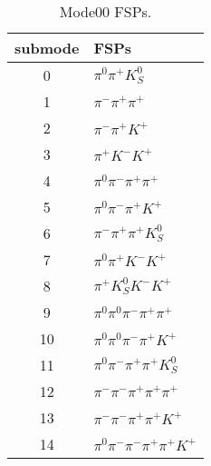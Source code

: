 \begin{table}[h!]
\begin{center}
\begin{tabular}{cl}
\hline
submode& FSPs\\
\hline
0 & $\pi^0 \pi^+ K_S^0 $ \\
1 & $\pi^- \pi^+ \pi^+ $ \\
2 & $\pi^- \pi^+ K^+ $ \\
3 & $\pi^+ K^- K^+ $ \\
4 & $\pi^0 \pi^- \pi^+ \pi^+ $ \\
5 & $\pi^0 \pi^- \pi^+ K^+ $ \\
6 & $\pi^- \pi^+ \pi^+ K_S^0 $ \\
7 & $\pi^0 \pi^+ K^- K^+ $ \\
8 & $\pi^+ K_S^0 K^- K^+ $ \\
9 & $\pi^0 \pi^0 \pi^- \pi^+ \pi^+ $ \\
10 & $\pi^0 \pi^0 \pi^- \pi^+ K^+ $ \\
11 & $\pi^0 \pi^- \pi^+ \pi^+ K_S^0 $ \\
12 & $\pi^- \pi^- \pi^+ \pi^+ \pi^+ $ \\
13 & $\pi^- \pi^- \pi^+ \pi^+ K^+ $ \\
14 & $\pi^0 \pi^- \pi^- \pi^+ \pi^+ K^+ $ \\
\hline
\end{tabular}
\label{tab:Mode00FSPs}
\caption{Mode00 FSPs.}
\end{center}
\end{table}
